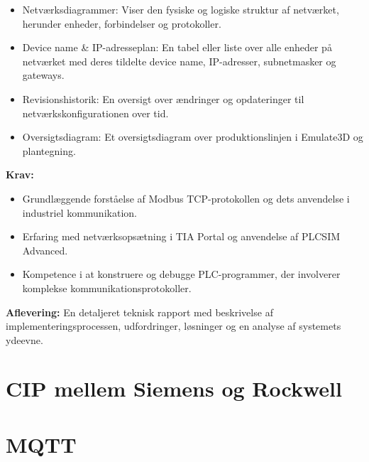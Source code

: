 \begin{enumerate}
\begin{itemize}
		\item Netværksdiagrammer: Viser den fysiske og logiske struktur af netværket, herunder enheder, forbindelser og protokoller.
		\item Device name \& IP-adresseplan: En tabel eller liste over alle enheder på netværket med deres tildelte device name, IP-adresser, subnetmasker og gateways.
		\item Revisionshistorik: En oversigt over ændringer og opdateringer til netværkskonfigurationen over tid.
		\item Oversigtsdiagram: Et oversigtsdiagram over produktionslinjen i Emulate3D og plantegning.
	\end{itemize}
\end{enumerate}

\textbf{Krav:}
\begin{itemize}
	\item Grundlæggende forståelse af Modbus TCP-protokollen og dets anvendelse i industriel kommunikation.
	\item Erfaring med netværksopsætning i TIA Portal og anvendelse af PLCSIM Advanced.
	\item Kompetence i at konstruere og debugge PLC-programmer, der involverer komplekse kommunikationsprotokoller.
\end{itemize}

\noindent\textbf{Aflevering:} En detaljeret teknisk rapport med beskrivelse af implementeringsprocessen, udfordringer, løsninger og en analyse af systemets ydeevne.

\section{CIP mellem Siemens og Rockwell}

\section{MQTT}
\label{subsec:mqtt_communication_plc}

